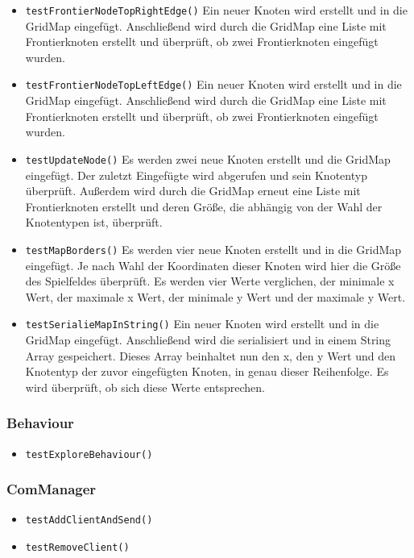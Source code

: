 \documentclass[10pt,a4paper]{article}
\begin{document}
\begin{itemize}
				\item \texttt{testFrontierNodeTopRightEdge()} Ein neuer Knoten wird erstellt und in die GridMap eingefügt. Anschließend wird durch die GridMap eine Liste mit 									Frontierknoten erstellt und überprüft, ob zwei Frontierknoten eingefügt wurden.
				\item \texttt{testFrontierNodeTopLeftEdge()} Ein neuer Knoten wird erstellt und in die GridMap eingefügt. Anschließend wird durch die GridMap eine Liste mit 									Frontierknoten erstellt und überprüft, ob zwei Frontierknoten eingefügt wurden.
				\item \texttt{testUpdateNode()} Es werden zwei neue Knoten erstellt und die GridMap eingefügt. Der zuletzt Eingefügte wird abgerufen und sein Knotentyp überprüft. Außerdem 					wird durch die GridMap erneut eine Liste mit Frontierknoten erstellt und deren Größe, die abhängig von der Wahl der Knotentypen ist, überprüft.
				\item \texttt{testMapBorders()} Es werden vier neue Knoten erstellt und in die GridMap eingefügt. Je nach Wahl der Koordinaten dieser Knoten wird hier die Größe des 							Spielfeldes überprüft. Es werden vier Werte verglichen, der minimale x Wert, der maximale x Wert, der minimale y Wert und der maximale y Wert.
				\item \texttt{testSerialieMapInString()} Ein neuer Knoten wird erstellt und in die GridMap eingefügt. Anschließend wird die serialisiert und in einem String Array 								gespeichert. Dieses Array beinhaltet nun den x, den y Wert und den Knotentyp der zuvor eingefügten Knoten, in genau dieser Reihenfolge. Es wird überprüft, ob sich diese Werte 				entsprechen.
			\end{itemize}
			
			\subsubsection{Behaviour}
			\begin{itemize}
				\item \texttt{testExploreBehaviour()} 
			\end{itemize}
			
			\subsubsection{ComManager}
			\begin{itemize}
				\item \texttt{testAddClientAndSend()}
				\item \texttt{testRemoveClient()}
			\end{itemize}
			
\end{document}
